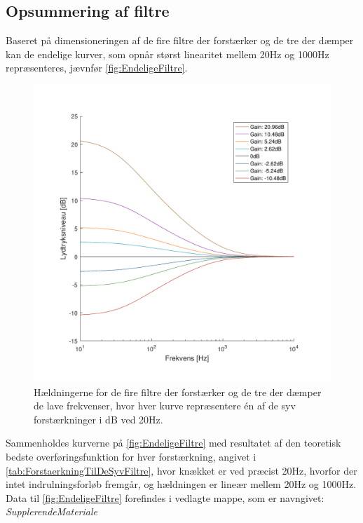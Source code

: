 \subsection{Opsummering af filtre}
\label{OpsummeringAfFiltre}
%
Baseret på dimensioneringen af de fire filtre der forstærker og de tre der dæmper kan de endelige kurver, som opnår størst linearitet mellem 20Hz og 1000Hz repræsenteres, jævnfør \autoref{fig:EndeligeFiltre}.
%
\begin{figure}[H]
	\centering
	\includegraphics[resolution=300,width=\textwidth]{Figure/DesignAfFilter/EndeligeFiltre.pdf}
	\caption{Hældningerne for de fire filtre der forstærker og de tre der dæmper de lave frekvenser, hvor hver kurve repræsentere én af de syv forstærkninger i dB ved 20Hz.}
	\label{fig:EndeligeFiltre}
\end{figure}
\noindent
%
Sammenholdes kurverne på \autoref{fig:EndeligeFiltre} med resultatet af den teoretisk bedste overføringsfunktion for hver forstærkning, angivet i \autoref{tab:ForstaerkningTilDeSyvFiltre}, hvor knækket er ved præcist 20Hz, hvorfor der intet indrulningsforløb fremgår, og hældningen er lineær mellem 20Hz og 1000Hz. Data til \autoref{fig:EndeligeFiltre} forefindes i vedlagte mappe, som er navngivet: \textit{SupplerendeMateriale}
%
